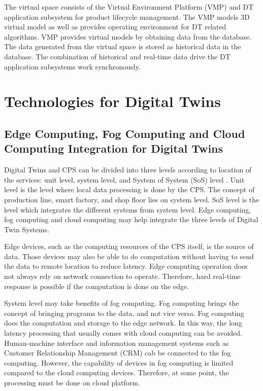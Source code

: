 \documentclass[article]{aaltoseries}
\begin{document}
The virtual space consists of the Virtual Environment Platform (VMP) and DT application subsystem for product lifecycle management. The VMP models 3D virtual model as well as provides operating environment for DT related algorithms. VMP provides virtual models by obtaining data from the database. The data generated from the virtual space is stored as historical data in the database. The combination of historical and real-time data drive the DT application subsystems work synchronously.


\section{Technologies for Digital Twins}
\subsection{Edge Computing, Fog Computing and Cloud Computing Integration for Digital Twins}
Digital Twins and CPS can be divided into three levels according to location of the services: unit level, system level, and System of System (SoS) level \cite{qi2018modeling}. Unit level is the level where local data processing is done by the CPS. The concept of production line, smart factory, and shop floor lies on system level. SoS level is the level which integrates the different systems from system level. Edge computing, fog computing and cloud computing may help integrate the three levels of Digital Twin Systems.

Edge devices, such as the computing resources of the CPS itself, is the source of data. Those devices may also be able to do computation without having to send the data to remote location to reduce latency. Edge computing operation does not always rely on network connection to operate. Therefore, hard real-time response is possible if the computation is done on the edge.

System level may take benefits of fog computing. Fog computing brings the concept of bringing programs to the data, and not vice versa. Fog computing does the computation and storage to the edge network. In this way, the long latency processing that usually comes with cloud computing can be avoided. Human-machine interface and information management systems such as Customer Relationship Management (CRM) cab be connected to the fog computing. However, the capability of devices in fog computing is limited compared to the cloud computing devices. Therefore, at some point, the processing must be done on cloud platform. 
\end{document}
